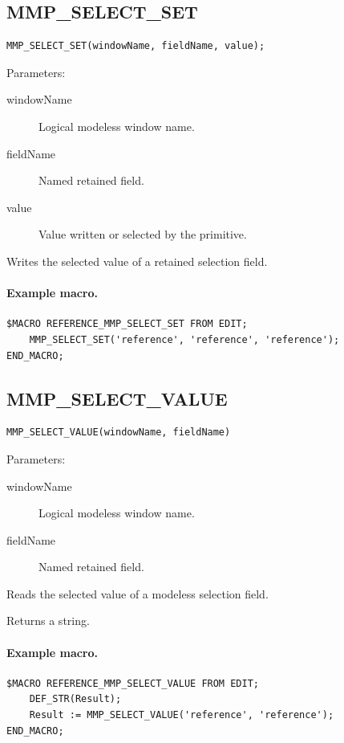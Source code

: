 \documentclass[a4paper,10pt,twoside,openany]{book}
\newenvironment{mrmacextension}{\begin{changebar}}{\end{changebar}}
\begin{document}
\begin{mrmacextension}
\label{prim:procedure-mmp-select-set}
\subsection*{MMP\_SELECT\_SET}
\begin{verbatim}
MMP_SELECT_SET(windowName, fieldName, value);
\end{verbatim}
Parameters:
\begin{description}
\item[windowName] Logical modeless window name.
\item[fieldName] Named retained field.
\item[value] Value written or selected by the primitive.
\end{description}

Writes the selected value of a retained selection field.

\paragraph{Example macro.}
\begin{verbatim}
$MACRO REFERENCE_MMP_SELECT_SET FROM EDIT;
    MMP_SELECT_SET('reference', 'reference', 'reference');
END_MACRO;
\end{verbatim}
\end{mrmacextension}

\begin{mrmacextension}
\label{prim:intrinsic-mmp-select-value}
\subsection*{MMP\_SELECT\_VALUE}
\begin{verbatim}
MMP_SELECT_VALUE(windowName, fieldName)
\end{verbatim}
Parameters:
\begin{description}
\item[windowName] Logical modeless window name.
\item[fieldName] Named retained field.
\end{description}

Reads the selected value of a modeless selection field.

Returns a string.

\paragraph{Example macro.}
\begin{verbatim}
$MACRO REFERENCE_MMP_SELECT_VALUE FROM EDIT;
    DEF_STR(Result);
    Result := MMP_SELECT_VALUE('reference', 'reference');
END_MACRO;
\end{verbatim}
\end{mrmacextension}
\end{document}
